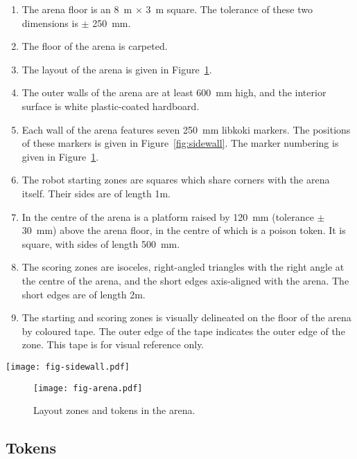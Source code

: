 \begin{enumerate}
  \item The arena floor is an \SI{8}{m} $\times$ \SI{3}{m} square. The tolerance
        of these two dimensions is $\pm$ \SI{250}{mm}.
  \item The floor of the arena is carpeted.
  \item The layout of the arena is given in Figure~\ref{fig:arena}.
  \item The outer walls of the arena are at least \SI{600}{mm} high, and the
        interior surface is white plastic-coated hardboard.
  \item Each wall of the arena features seven \SI{250}{mm} libkoki markers.
        The positions of these markers is given in Figure~\ref{fig:sidewall}.
        The marker numbering is given in Figure~\ref{fig:arena}.
  \item The robot starting zones are squares which share corners with the arena
        itself. Their sides are of length \si{1}{m}.
  \item In the centre of the arena is a platform raised by \SI{120}{mm}
        (tolerance $\pm$ \SI{30}{mm}) above the arena floor, in the centre of
        which is a poison token. It is square, with sides of length \SI{500}{mm}.
  \item The scoring zones are isoceles, right-angled triangles with the right
        angle at the centre of the arena, and the short edges axis-aligned with
        the arena. The short edges are of length \si{2}{m}.
  \item The starting and scoring zones is visually delineated on the floor of
        the arena by coloured tape. The outer edge of the tape indicates the
        outer edge of the zone. This tape is for visual reference only.
\end{enumerate}

\begin{sidewaysfigure}
  \texttt{[image: fig-sidewall.pdf]}
  \caption{Layout of markers along each arena wall.}
  \label{fig:sidewall}
\end{sidewaysfigure}

\begin{figure}
  \texttt{[image: fig-arena.pdf]}
  \caption{Layout zones and tokens in the arena.}
  \label{fig:arena}
\end{figure}

\subsection{Tokens}
\label{spec:tokens}

